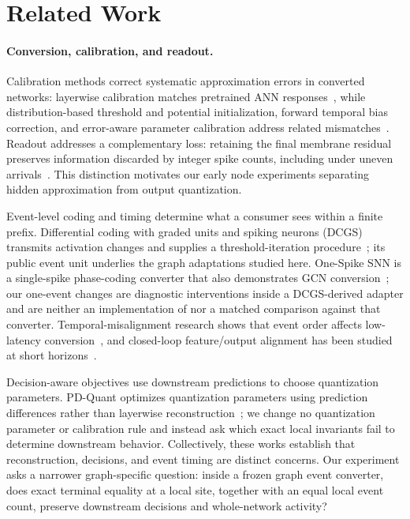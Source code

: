 \documentclass[10pt,twocolumn,letterpaper]{article}
\begin{document}
\section{Related Work}
\paragraph{Conversion, calibration, and readout.}
Calibration methods correct systematic approximation errors in converted networks: layerwise calibration matches pretrained ANN responses~\cite{li2021}, while distribution-based threshold and potential initialization, forward temporal bias correction, and error-aware parameter calibration address related mismatches~\cite{bojkovic2024,wu2024ftbc,li2024erroraware}. Readout addresses a complementary loss: retaining the final membrane residual preserves information discarded by integer spike counts, including under uneven arrivals~\cite{hao2023residual}. This distinction motivates our early node experiments separating hidden approximation from output quantization.

Event-level coding and timing determine what a consumer sees within a finite prefix. Differential coding with graded units and spiking neurons (DCGS) transmits activation changes and supplies a threshold-iteration procedure~\cite{huang2025}; its public event unit underlies the graph adaptations studied here. One-Spike SNN is a single-spike phase-coding converter that also demonstrates GCN conversion~\cite{hwang2025onespike}; our one-event changes are diagnostic interventions inside a DCGS-derived adapter and are neither an implementation of nor a matched comparison against that converter. Temporal-misalignment research shows that event order affects low-latency conversion~\cite{bojkovic2025}, and closed-loop feature/output alignment has been studied at short horizons~\cite{li2026cka}.

Decision-aware objectives use downstream predictions to choose quantization parameters. PD-Quant optimizes quantization parameters using prediction differences rather than layerwise reconstruction~\cite{liu2023pdquant}; we change no quantization parameter or calibration rule and instead ask which exact local invariants fail to determine downstream behavior. Collectively, these works establish that reconstruction, decisions, and event timing are distinct concerns. Our experiment asks a narrower graph-specific question: inside a frozen graph event converter, does exact terminal equality at a local site, together with an equal local event count, preserve downstream decisions and whole-network activity?
\end{document}
